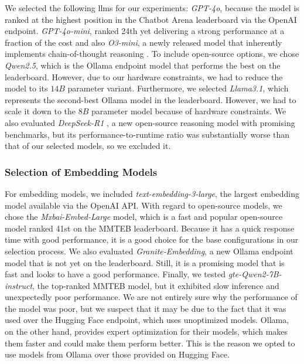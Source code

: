 We selected the following \glspl{llm} for our experiments: \emph{GPT-4o}, because the model is ranked at the highest position in the Chatbot Arena leaderboard via the OpenAI endpoint. \emph{GPT-4o-mini}, ranked 24th yet delivering a strong performance at a fraction of the cost and also \emph{O3-mini}, a newly released model that inherently implements chain-of-thought reasoning \cite{wei_chain--thought_2023}. To include open-source options, we chose \emph{Qwen2.5}, which is the Ollama endpoint model that performs the best on the leaderboard. However, due to our hardware constraints, we had to reduce the model to its $14B$ parameter variant. Furthermore, we selected \emph{Llama3.1}, which represents the second-best Ollama model in the leaderboard. However, we had to scale it down to the $8B$ parameter model because of hardware constraints. We also evaluated \emph{DeepSeek-R1} \cite{deepseek-ai_deepseek-r1_2025}, a new open-source reasoning model with promising benchmarks, but its performance-to-runtime ratio was substantially worse than that of our selected models, so we excluded it.

\subsubsection{Selection of Embedding Models} 

For embedding models, we included \emph{text-embedding-3-large}, the largest embedding model available via the OpenAI API. With regard to open-source models, we chose the \emph{Mxbai-Embed-Large} model, which is a fast and popular open-source model ranked 41st on the MMTEB leaderboard. Because it has a quick response time with good performance, it is a good choice for the base configurations in our selection process. We also evaluated \emph{Granite-Embedding}, a new Ollama endpoint model that is not yet on the leaderboard. Still, it is a promising model that is fast and looks to have a good performance. Finally, we tested \emph{gte-Qwen2-7B-instruct}, the top-ranked MMTEB model, but it exhibited slow inference and unexpectedly poor performance. We are not entirely sure why the performance of the model was poor, but we suspect that it may be due to the fact that it was used over the Hugging Face endpoint, which uses unoptimized models. Ollama, on the other hand, provides expert optimization for their models, which makes them faster and could make them perform better. This is the reason we opted to use models from Ollama over those provided on Hugging Face.

